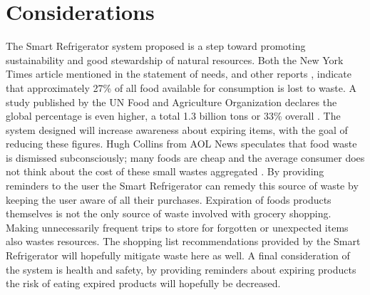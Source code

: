 \documentclass[11pt,letterpaper]{article}
\begin{document}
\section{Considerations}
The Smart Refrigerator system proposed is a step toward promoting sustainability and good stewardship of natural resources. Both the New York Times article mentioned in the statement of needs, and other reports \cite{times}\cite{aol}, indicate that approximately 27\% of all food available for consumption is lost to waste. A study published by the UN Food and Agriculture Organization declares the global percentage is even higher, a  total 1.3 billion tons or 33\% overall \cite{dutch}. The system designed will increase awareness about expiring items, with the goal of reducing these figures. Hugh Collins from AOL News speculates that food waste is dismissed subconsciously; many foods are cheap and the average consumer does not think about the cost of these small wastes aggregated \cite{aol}. By providing reminders to the user the Smart Refrigerator can remedy this source of waste by keeping the user aware of all their purchases. Expiration of foods products themselves is not the only source of waste involved with grocery shopping. Making unnecessarily frequent trips to store for forgotten or unexpected items also wastes resources. The shopping list recommendations provided by the Smart Refrigerator will hopefully mitigate waste here as well. A final consideration of the system is health and safety, by providing reminders about expiring products the risk of eating expired products will hopefully be decreased. 
\end{document}
